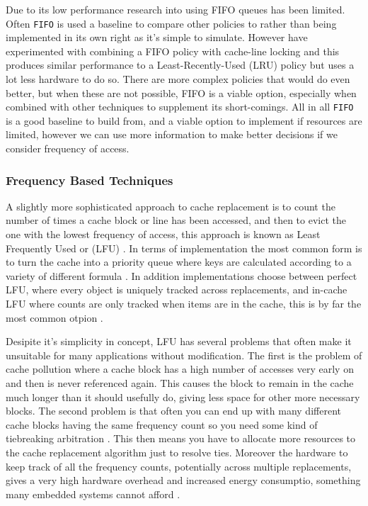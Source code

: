 Due to its low performance research into using FIFO queues has been limited. Often \texttt{FIFO} is used a baseline to compare other policies to \cite{faresPerformanceEvaluationTraditional2012} rather than being implemented in its own right as it's simple to simulate. However \citet{wei-chetsengPRRLowoverheadCache2012} have experimented with combining a FIFO policy with cache-line locking and this produces similar performance to a Least-Recently-Used (LRU) policy but uses a lot less hardware to do so. There are more complex policies that would do even better, but when these are not possible, FIFO is a viable option, especially when combined with other techniques to supplement its short-comings. All in all \texttt{FIFO} is a good baseline to build from, and a viable option to implement if resources are limited, however we can use more information to make better decisions if we consider frequency of access. 

\subsubsection{Frequency Based Techniques}

A slightly more sophisticated approach to cache replacement is to count the number of times a cache block or line has been accessed, and then to evict the one with the lowest frequency of access, this approach is known as Least Frequently Used or (LFU) . In terms of implementation the most common form is to turn the cache into a priority queue where keys are calculated according to a variety of different formula \cite{podlipnigSurveyWebCache2003}. In addition implementations choose between perfect LFU, where every object is uniquely tracked across replacements, and in-cache LFU where counts are only tracked when items are in the cache, this is by far the most common otpion \cite{podlipnigSurveyWebCache2003}.

Desipite it's simplicity in concept, LFU has several problems that often make it unsuitable for many applications without modification. The first is the problem of cache pollution \cite{karedlaCachingStrategiesImprove1994} where a cache block has a high number of accesses very early on and then is never referenced again. This causes the block to remain in the cache much longer than it should usefully do, giving less space for other more necessary blocks. The second problem is that often you can end up with many different cache blocks having the same frequency count so you need some kind of tiebreaking arbitration \cite{podlipnigSurveyWebCache2003}. This then means you  have to allocate more resources to the cache replacement algorithm just to resolve ties. Moreover the hardware to keep track of all the frequency counts, potentially across multiple replacements, gives a very high hardware overhead and increased energy consumptio, something many embedded systems cannot afford \cite{pandaSurveyReplacementStrategies2016}. 

